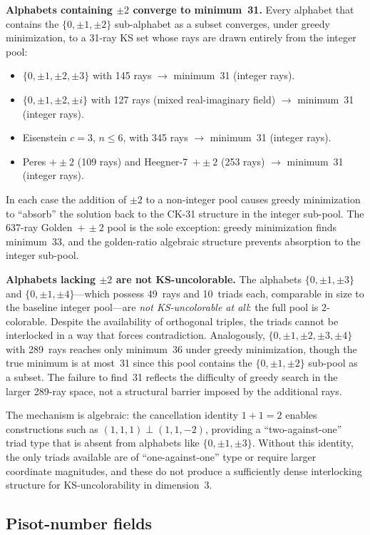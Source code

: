 \documentclass[twocolumn,pra,superscriptaddress,nofootinbib]{revtex4-2}
\begin{document}
\textbf{Alphabets containing $\pm2$ converge to minimum~31.} Every alphabet
that contains the $\{0,\pm1,\pm2\}$ sub-alphabet as a subset converges, under
greedy minimization, to a 31-ray KS set whose rays are drawn entirely from the
integer pool:
\begin{itemize}
\item $\{0,\pm1,\pm2,\pm3\}$ with 145 rays $\to$ minimum~31 (integer rays).
\item $\{0,\pm1,\pm2,\pm i\}$ with 127 rays (mixed real-imaginary field)
  $\to$ minimum~31 (integer rays).
\item Eisenstein $c=3$, $n \leq 6$, with 345 rays $\to$ minimum~31 (integer
  rays).
\item Peres $+ \pm2$ (109 rays) and Heegner-7~$+ \pm2$ (253 rays) $\to$
  minimum~31 (integer rays).
\end{itemize}
In each case the addition of $\pm2$ to a non-integer pool causes greedy
minimization to ``absorb'' the solution back to the CK-31 structure in the
integer sub-pool. The 637-ray Golden~$+\,\pm2$ pool is the sole exception:
greedy minimization finds minimum~33, and the golden-ratio algebraic structure
prevents absorption to the integer sub-pool.

\textbf{Alphabets lacking $\pm2$ are not KS-uncolorable.} The alphabets
$\{0,\pm1,\pm3\}$ and $\{0,\pm1,\pm4\}$---which possess 49~rays and 10~triads
each, comparable in size to the baseline integer pool---are \emph{not
KS-uncolorable at all}: the full pool is 2-colorable. Despite the availability
of orthogonal triples, the triads cannot be interlocked in a way that forces
contradiction. Analogously, $\{0,\pm1,\pm2,\pm3,\pm4\}$ with 289~rays reaches
only minimum~36 under greedy minimization, though the true minimum is at
most~31 since this pool contains the $\{0,\pm1,\pm2\}$ sub-pool as a subset.
The failure to find~31 reflects the difficulty of greedy search in the larger
289-ray space, not a structural barrier imposed by the additional rays.

The mechanism is algebraic: the cancellation identity $1+1=2$ enables
constructions such as $(1,1,1) \perp (1,1,-2)$, providing a ``two-against-one''
triad type that is absent from alphabets like $\{0,\pm1,\pm3\}$. Without this
identity, the only triads available are of ``one-against-one'' type or require
larger coordinate magnitudes, and these do not produce a sufficiently dense
interlocking structure for KS-uncolorability in dimension~3.

\subsection{Pisot-number fields}
\end{document}
